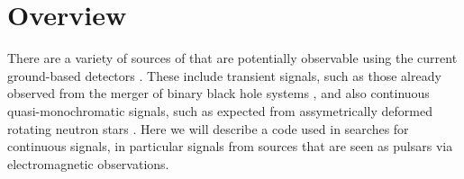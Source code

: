 \section{Overview}

There are a variety of sources of \gws that are potentially observable using the current ground-based \gw detectors \citep{2015CQGra..32g4001L,2015CQGra..32b4001A}.
These include transient signals, such as those already observed from the merger of binary black hole systems \citep{2016PhRvL.116f1102A,2016PhRvL.116x1103A}, and also
continuous quasi-monochromatic signals, such as expected from assymetrically deformed rotating neutron stars \citep[see, e.g., Section~III of][]{2004PhRvD..69h2004A}.
Here we will describe a code used in searches for continuous \gw signals, in particular signals from sources that are seen as pulsars via electromagnetic observations.

